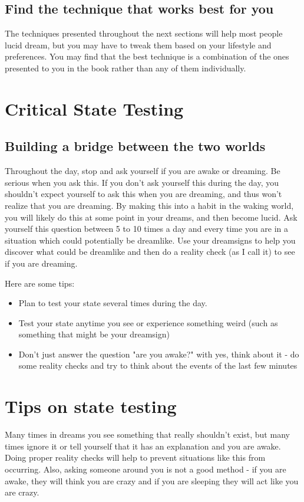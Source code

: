 \documentclass{report}
\begin{document}
\subsection{Find the technique that works best for you}
The techniques presented throughout the next sections will help most people lucid dream, but you may have to tweak them based on your lifestyle and preferences. You may find that the best technique is a combination of the ones presented to you in the book rather than any of them individually.

\section{Critical State Testing}
\subsection{Building a bridge between the two worlds}
Throughout the day, stop and ask yourself if you are awake or dreaming. Be serious when you ask this. If you don't ask yourself this during the day, you shouldn't expect yourself to ask this when you are dreaming, and thus won't realize that you are dreaming. By making this into a habit in the waking world, you will likely do this at some point in your dreams, and then become lucid. Ask yourself this question between 5 to 10 times a day and every time you are in a situation which could potentially be dreamlike. Use your dreamsigns to help you discover what could be dreamlike and then do a reality check (as I call it) to see if you are dreaming.

Here are some tips:
\begin{itemize}
  \item Plan to test your state several times during the day.
  \item Test your state anytime you see or experience something weird (such as something that might be your dreamsign)
  \item Don't just answer the question "are you awake?" with yes, think about it - do some reality checks and try to think about the events of the last few minutes
\end{itemize}

\section{Tips on state testing}
Many times in dreams you see something that really shouldn't exist, but many times ignore it or tell yourself that it has an explanation and you are awake. Doing proper reality checks will help to prevent situations like this from occurring. Also, asking someone around you is not a good method - if you are awake, they will think you are crazy and if you are sleeping they will act like you are crazy.
\end{document}
